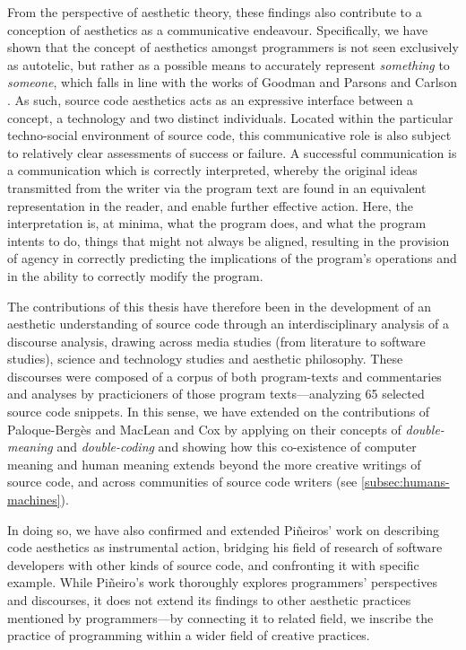 From the perspective of aesthetic theory, these findings also contribute to a conception of aesthetics as a communicative endeavour. Specifically, we have shown that the concept of aesthetics amongst programmers is not seen exclusively as autotelic, but rather as a possible means to accurately represent \emph{something} to \emph{someone}, which falls in line with the works of Goodman and Parsons and Carlson \citep{goodman_languages_1976,parsons_functional_2012}. As such, source code aesthetics acts as an expressive interface between a concept, a technology and two distinct individuals. Located within the particular techno-social environment of source code, this communicative role is also subject to relatively clear assessments of success or failure. A successful communication is a communication which is correctly interpreted, whereby the original ideas transmitted from the writer via the program text are found in an equivalent representation in the reader, and enable further effective action. Here, the interpretation is, at minima, what the program does, and what the program intents to do, things that might not always be aligned, resulting in the provision of agency in correctly predicting the implications of the program's operations and in the ability to correctly modify the program.

The contributions of this thesis have therefore been in the development of an aesthetic understanding of source code through an interdisciplinary analysis of a discourse analysis, drawing across media studies (from literature to software studies), science and technology studies and aesthetic philosophy. These discourses were composed of a corpus of both program-texts and commentaries and analyses by practicioners of those program texts—analyzing 65  selected source code snippets. In this sense, we have extended on the contributions of Paloque-Bergès and MacLean and Cox by applying on their concepts of \emph{double-meaning}  and \emph{double-coding} and showing how this co-existence of computer meaning and human meaning extends beyond the more creative writings of source code, and across communities of source code writers (see \ref{subsec:humans-machines}).

In doing so, we have also confirmed and extended Piñeiros' work on describing code aesthetics as instrumental action, bridging his field of research of software developers with other kinds of source code, and confronting it with specific example. While Piñeiro's work thoroughly explores programmers' perspectives and discourses, it does not extend its findings to other aesthetic practices mentioned by programmers—by connecting it to related field, we inscribe the practice of programming within a wider field of creative practices.

